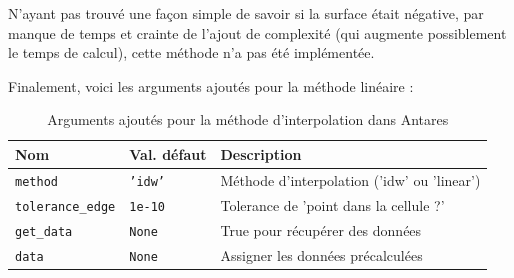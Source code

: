 N'ayant pas trouvé une façon simple de savoir si la surface était négative, par manque de temps et crainte de l'ajout de complexité (qui augmente possiblement le temps de calcul), cette méthode n'a pas été implémentée.

Finalement, voici les arguments ajoutés pour la méthode linéaire :

\label{arguments_ajoutes}
\begin{table}[H]
    \centering
    \begin{tabular}{|l|l|l|}
    \hline
    \textbf{Nom} & \textbf{Val. défaut} & \textbf{Description} \\ \hline %

    \texttt{method} & \texttt{'idw'} & Méthode d'interpolation ('idw' ou 'linear') \\
    \texttt{tolerance\_edge} & \texttt{1e-10} & Tolerance de 'point dans la cellule ?' \\
    \texttt{get\_data} & \texttt{None} & True pour récupérer des données \\ 
    \texttt{data} & \texttt{None} & Assigner les données précalculées \\ \hline
    \end{tabular}
    \caption{Arguments ajoutés pour la méthode d'interpolation dans Antares}
    \label{tab:arguments_interpolation2}
\end{table}

